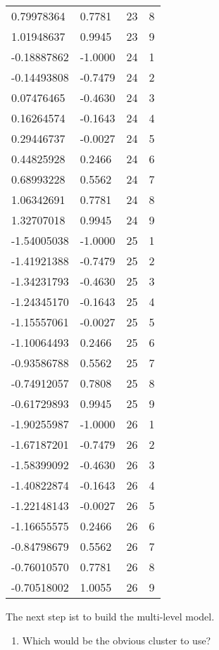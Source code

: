 \documentclass[11pt]{article}
\providecommand{\tightlist}{%
      \setlength{\itemsep}{0pt}\setlength{\parskip}{0pt}}
\begin{document}
\begin{tabular}{llll}
	  0.79978364 &  0.7781 & 23 & 8\\
	  1.01948637 &  0.9945 & 23 & 9\\
	 -0.18887862 & -1.0000 & 24 & 1\\
	 -0.14493808 & -0.7479 & 24 & 2\\
	  0.07476465 & -0.4630 & 24 & 3\\
	  0.16264574 & -0.1643 & 24 & 4\\
	  0.29446737 & -0.0027 & 24 & 5\\
	  0.44825928 &  0.2466 & 24 & 6\\
	  0.68993228 &  0.5562 & 24 & 7\\
	  1.06342691 &  0.7781 & 24 & 8\\
	  1.32707018 &  0.9945 & 24 & 9\\
	 -1.54005038 & -1.0000 & 25 & 1\\
	 -1.41921388 & -0.7479 & 25 & 2\\
	 -1.34231793 & -0.4630 & 25 & 3\\
	 -1.24345170 & -0.1643 & 25 & 4\\
	 -1.15557061 & -0.0027 & 25 & 5\\
	 -1.10064493 &  0.2466 & 25 & 6\\
	 -0.93586788 &  0.5562 & 25 & 7\\
	 -0.74912057 &  0.7808 & 25 & 8\\
	 -0.61729893 &  0.9945 & 25 & 9\\
	 -1.90255987 & -1.0000 & 26 & 1\\
	 -1.67187201 & -0.7479 & 26 & 2\\
	 -1.58399092 & -0.4630 & 26 & 3\\
	 -1.40822874 & -0.1643 & 26 & 4\\
	 -1.22148143 & -0.0027 & 26 & 5\\
	 -1.16655575 &  0.2466 & 26 & 6\\
	 -0.84798679 &  0.5562 & 26 & 7\\
	 -0.76010570 &  0.7781 & 26 & 8\\
	 -0.70518002 &  1.0055 & 26 & 9\\
\end{tabular}


    
    The next step ist to build the multi-level model.

\begin{enumerate}
\def\labelenumi{\arabic{enumi}.}
\tightlist
\item
  Which would be the obvious cluster to use?
\end{enumerate}
\end{document}
